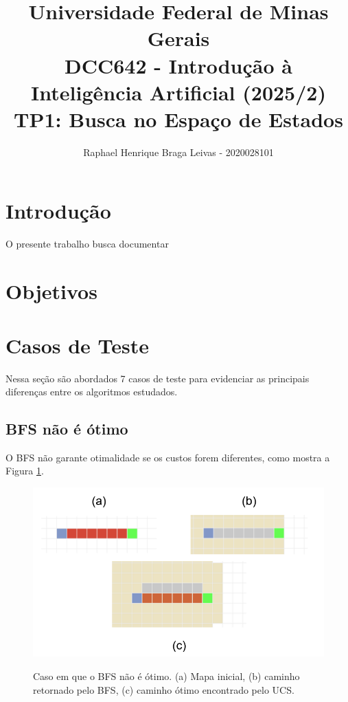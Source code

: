 \documentclass[letterpaper]{article} %
\title{Universidade Federal de Minas Gerais \\[10pt]
DCC642 - Introdução à Inteligência Artificial (2025/2) \\
 TP1: Busca no Espaço de Estados}
\author {
    Raphael Henrique Braga Leivas - 2020028101
}
\begin{document}
\maketitle


\section{Introdução}

O presente trabalho busca documentar

\section{Objetivos}

\section{Casos de Teste}

Nessa seção são abordados 7 casos de teste para evidenciar as principais 
diferenças entre os algoritmos estudados.


\subsection{BFS não é ótimo}

O BFS não garante otimalidade se os custos forem diferentes, como 
mostra a Figura \ref{fig:BFS_nao_otimo}.

\begin{figure}[htb]
	\centering 
    \caption{Caso em que o BFS não é ótimo. (a) Mapa inicial, (b)
	caminho retornado pelo BFS, (c) caminho ótimo encontrado pelo UCS.}
	\includegraphics[width=\columnwidth]{images/BFS_nao_otimo.png}
	\label{fig:BFS_nao_otimo}
\end{figure}
\end{document}
